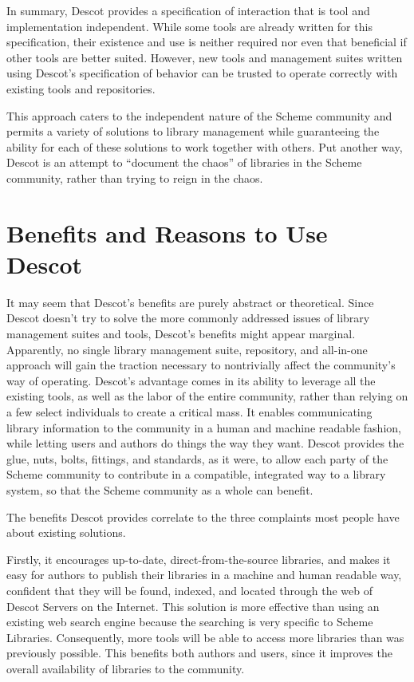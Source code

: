 In summary, Descot provides a specification of interaction 
that is tool and implementation independent. 
While some tools are already written for this specification, 
their existence and use is neither required nor even 
that beneficial if other tools are better suited. 
However, new tools and management suites written using 
Descot's specification of behavior can be trusted to operate 
correctly with existing tools and repositories. 

This approach caters to the independent nature of the Scheme 
community and permits a variety of solutions to library management 
while guaranteeing the ability for each of these solutions to work 
together with others. Put another way, Descot is an attempt to 
``document the chaos'' of libraries in the Scheme community, 
rather than trying to reign in the chaos. 

\section{Benefits and Reasons to Use Descot}

It may seem that Descot's benefits are purely abstract 
or theoretical. 
Since Descot doesn't try to solve the more commonly 
addressed issues of library management suites and tools, 
Descot's benefits might appear marginal.
Apparently, no single library management 
suite, repository, and all-in-one approach will gain 
the traction necessary to nontrivially affect the 
community's way of operating. 
Descot's advantage comes in its ability to leverage all 
the existing tools, as well as the labor of the entire 
community, rather than relying on a few select 
individuals to create a critical mass. 
It enables communicating library information to the 
community in a human and machine readable 
fashion, while letting users and authors do things the 
way they want.  Descot provides the glue, nuts, bolts, fittings, and 
standards, as it were, to allow each party of the Scheme 
community to contribute in a compatible, integrated way 
to a library system, so that the Scheme community as a 
whole can benefit. 

The benefits Descot provides correlate to the three 
complaints most people have about existing solutions.

Firstly, it encourages up-to-date, direct-from-the-source 
libraries, and makes it easy for authors to publish 
their libraries in a machine and human readable way, 
confident that they will be found, indexed, and located 
through the web of Descot Servers on the Internet. 
This solution is more effective than using an existing 
web search engine because the searching is very specific 
to Scheme Libraries. Consequently, more tools will be 
able to access more libraries than was previously possible. 
This benefits both authors and users, since it improves the 
overall availability of libraries to the community. 


